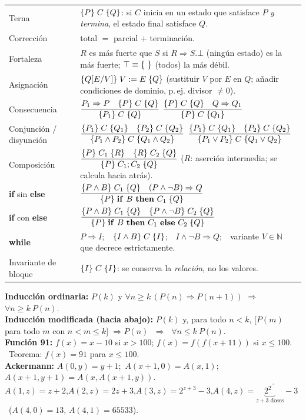 \begin{formulario}
\renewcommand{\arraystretch}{1.35}
\begin{tabular}{@{}p{4.3cm} p{11.3cm}@{}}
Terna & $\{P\}\;C\;\{Q\}$: si $C$ inicia en un estado que satisface $P$ \emph{y termina}, el estado final satisface $Q$. \\[2pt]
Corrección & total $=$ parcial $+$ terminación. \\[2pt]
Fortaleza & $R$ es más fuerte que $S$ si $R\Rightarrow S$.\quad $\bot$ (ningún estado) es la más fuerte; $\T\equiv\{\ \}$ (todos) la más débil. \\[2pt]
Asignación & $\{Q[E/V]\}\;V\mathrel{:=} E\;\{Q\}$ \quad (sustituir $V$ por $E$ en $Q$; añadir condiciones de dominio, p.\,ej. divisor $\neq0$). \\[2pt]
Consecuencia & $\dfrac{P_1\Rightarrow P\quad \{P\}\;C\;\{Q\}}{\{P_1\}\;C\;\{Q\}}$ \qquad $\dfrac{\{P\}\;C\;\{Q\}\quad Q\Rightarrow Q_1}{\{P\}\;C\;\{Q_1\}}$ \\[10pt]
Conjunción / disyunción & $\dfrac{\{P_1\}\;C\;\{Q_1\}\quad\{P_2\}\;C\;\{Q_2\}}{\{P_1\land P_2\}\;C\;\{Q_1\land Q_2\}}$ \qquad $\dfrac{\{P_1\}\;C\;\{Q_1\}\quad\{P_2\}\;C\;\{Q_2\}}{\{P_1\lor P_2\}\;C\;\{Q_1\lor Q_2\}}$ \\[10pt]
Composición & $\dfrac{\{P\}\;C_1\;\{R\}\quad\{R\}\;C_2\;\{Q\}}{\{P\}\;C_1;C_2\;\{Q\}}$ \quad ($R$: aserción intermedia; se calcula hacia atrás). \\[10pt]
\textbf{if} sin \textbf{else} & $\dfrac{\{P\land B\}\;C_1\;\{Q\}\quad (P\land\neg B)\Rightarrow Q}{\{P\}\;\mathbf{if}\ B\ \mathbf{then}\ C_1\;\{Q\}}$ \\[10pt]
\textbf{if} con \textbf{else} & $\dfrac{\hoare{P\land B}{C_1}{Q}\quad \hoare{P\land\neg B}{C_2}{Q}}{\hoare{P}{\kw{if}\ B\ \kw{then}\ C_1\ \kw{else}\ C_2}{Q}}$ \\[10pt]
\textbf{while} & $P\Rightarrow I$;\ \ $\{I\land B\}\;C\;\{I\}$;\ \ $I\land\neg B\Rightarrow Q$;\ \ variante $V\in\mathbb N$ que decrece estrictamente. \\[2pt]
Invariante de bloque & $\{I\}\;C\;\{I\}$: se conserva la \emph{relación}, no los valores.
\end{tabular}
\end{formulario}

\begin{formulario}
\textbf{Inducción ordinaria:} $P(k)$ y $\forall n\ge k\,(P(n)\Rightarrow P(n+1))$ $\Rightarrow$ $\forall n\ge k\ P(n)$.\\
\textbf{Inducción modificada (hacia abajo):} $P(k)$ y, para todo $n<k$, [$P(m)$ para todo $m$ con $n<m\le k$] $\Rightarrow P(n)$ $\;\Longrightarrow\;$ $\forall n\le k\ P(n)$.\\[3pt]
\textbf{Función 91:} $f(x)=x-10$ si $x>100$; $f(x)=f(f(x+11))$ si $x\le100$. \ Teorema: $f(x)=91$ para $x\le 100$.\\[3pt]
\textbf{Ackermann:} $A(0,y)=y+1$;\ $A(x+1,0)=A(x,1)$;\ $A(x+1,y+1)=A(x,A(x+1,y))$.\\
$A(1,z)=z+2$,\quad $A(2,z)=2z+3$,\quad $A(3,z)=2^{z+3}-3$,\quad $A(4,z)=\underbrace{2^{2^{\cdot^{\cdot^{2}}}}}_{z+3\text{ doses}}-3$ \ ($A(4,0)=13$, $A(4,1)=65533$).
\end{formulario}

